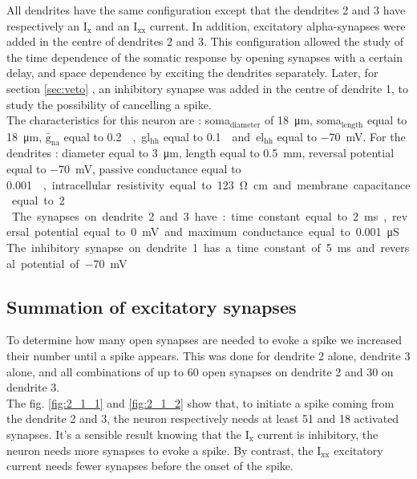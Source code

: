\documentclass[a4paper, 10pt, conference]{ieeeconf}      %
\begin{document}
All dendrites have the same configuration except that the dendrites 2 and 3 have respectively an I$_\text{x}$ and an I$_\text{xx}$ current. In addition, excitatory alpha-synapses were added in the centre of dendrites 2 and 3. This configuration allowed the study of the time dependence of the somatic response by opening synapses with a certain delay, and space dependence by exciting the dendrites separately. Later, for section \ref{sec:veto} , an inhibitory synapse was added in the centre of dendrite 1, to study the possibility of cancelling a spike. \\

The characteristics for this neuron are : soma$_\text{diameter}$ of \SI{18}{\micro\meter}, soma$_\text{length}$ equal to \SI{18}{\micro\meter}, $\bar{\text{g}}_\text{na}$ equal to \SI{0.2}{\siemens\per\centi\meter\square}, gl$_\text{hh}$ equal to \SI{0.1}{\milli\siemens\per\centi\meter\square} and el$_\text{hh}$ equal to \SI{-70}{\milli\volt}. For the dendrites : diameter equal to \SI{3}{\micro\meter}, length equal to \SI{0.5}{\milli\meter}, reversal potential equal to \SI{-70}{\milli\volt}, passive conductance equal to \SI{0.001}{\siemens\per\centi\meter\square}, intracellular resistivity equal to \SI{123}{\ohm\centi\meter} and membrane capacitance equal to \SI{2}{\micro\farad\per\centi\meter\square}. \\

The synapses on dendrite 2 and 3 have : time constant equal to \SI{2}{\milli\second}, reversal potential equal to \SI{0}{\milli\volt} and maximum conductance equal to \SI{0.001}{\micro\siemens}. The inhibitory synapse on dendrite 1 has a time constant of \SI{5}{\milli\second} and reversal potential of \SI{-70}{\milli\volt}. \\


\subsection{Summation of excitatory synapses}

To determine how many open synapses are needed to evoke a spike we increased their number until a spike appears. This was done for dendrite 2 alone, dendrite 3 alone, and all combinations of up to 60 open synapses on dendrite 2 and 30 on dendrite 3. \\

The fig. \ref{fig:2_1_1} and \ref{fig:2_1_2} show that, to initiate a spike coming from the dendrite 2 and 3, the neuron respectively needs at least 51 and 18 activated synapses. It’s a sensible result knowing that the I$_\text{x}$ current is inhibitory, the neuron needs more synapses to evoke a spike. By contrast, the I$_\text{xx}$ excitatory current needs fewer synapses before the onset of the spike. \\
\end{document}

